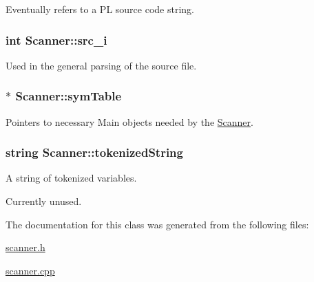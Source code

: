 Eventually refers to a PL source code string. 

\hypertarget{classScanner_ae8004b082846221da9bbd8affc02bf2b}{
\subsubsection[{src\_\-i}]{\setlength{\rightskip}{0pt plus 5cm}int {\bf Scanner::src\_\-i}}}
\label{classScanner_ae8004b082846221da9bbd8affc02bf2b}


Used in the general parsing of the source file. 

\hypertarget{classScanner_a9b0471200485b0ab6d368c93ad718229}{
\subsubsection[{symTable}]{$\ast$ {\bf Scanner::symTable}}}
\label{classScanner_a9b0471200485b0ab6d368c93ad718229}


Pointers to necessary Main objects needed by the \hyperlink{classScanner}{Scanner}. 

\hypertarget{classScanner_ab9502fbbd4851a25aec126093247ec6e}{
\subsubsection[{tokenizedString}]{\setlength{\rightskip}{0pt plus 5cm}string {\bf Scanner::tokenizedString}}}
\label{classScanner_ab9502fbbd4851a25aec126093247ec6e}


A string of tokenized variables. 

Currently unused. 

The documentation for this class was generated from the following files:\begin{DoxyCompactItemize}
\item 
\hyperlink{scanner_8h}{scanner.h}\item 
\hyperlink{scanner_8cpp}{scanner.cpp}\end{DoxyCompactItemize}
